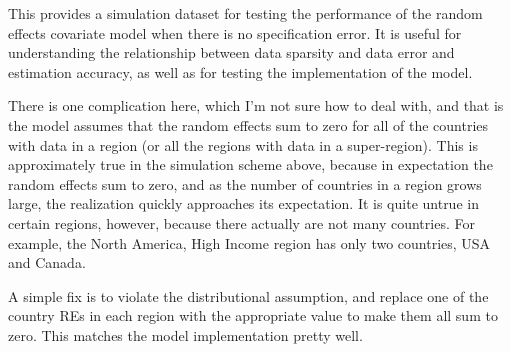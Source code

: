 This provides a simulation dataset for testing the performance of the
random effects covariate model when there is no specification error.
It is useful for understanding the relationship between data sparsity
and data error and estimation accuracy, as well as for testing the
implementation of the model.

There is one complication here, which I'm not sure how to deal with,
and that is the model assumes that the random effects sum to zero for
all of the countries with data in a region (or all the regions with
data in a super-region).  This is approximately true in the simulation
scheme above, because in expectation the random effects sum to zero,
and as the number of countries in a region grows large, the
realization quickly approaches its expectation.  It is quite untrue in
certain regions, however, because there actually are not many
countries.  For example, the North America, High Income region has
only two countries, USA and Canada.

A simple fix is to violate the distributional assumption, and replace
one of the country REs in each region with the appropriate value to
make them all sum to zero.  This matches the model implementation
pretty well.
